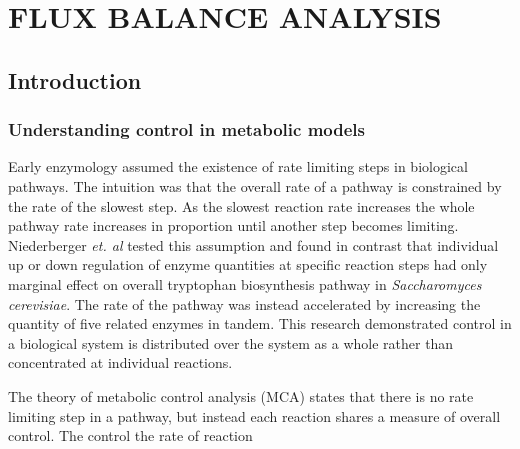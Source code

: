 \chapter{FLUX BALANCE ANALYSIS}

\section{Introduction}

\subsection{Understanding control in metabolic models}

Early enzymology assumed the existence of rate limiting steps in biological pathways. The intuition was that the overall rate of a pathway is constrained by the rate of the slowest step. As the slowest reaction rate increases the whole pathway rate increases in proportion until another step becomes limiting. Niederberger \emph{et. al} tested this assumption and found in contrast that individual up or down regulation of enzyme quantities at specific reaction steps had only marginal effect on overall tryptophan biosynthesis pathway in \emph{Saccharomyces cerevisiae}. The rate of the pathway was instead accelerated by increasing the quantity of five related enzymes in tandem. This research demonstrated control in a biological system is distributed over the system as a whole rather than concentrated at individual reactions.

The theory of metabolic control analysis (MCA)  states that there is no rate limiting step in a pathway, but instead each reaction shares a measure of overall control. The control the rate of reaction

